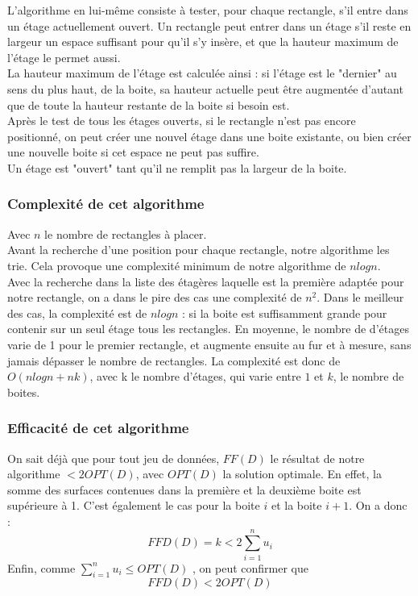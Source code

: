 \documentclass[12pt]{article}
\begin{document}
L'algorithme en lui-même consiste à tester, pour chaque rectangle, s'il entre dans un étage actuellement ouvert. Un rectangle peut entrer dans un étage s'il reste en largeur un espace suffisant pour qu'il s'y insère, et que la hauteur maximum de l'étage le permet aussi. \\
La hauteur maximum de l'étage est calculée ainsi : si l'étage est le "dernier" au sens du plus haut, de la boite, sa hauteur actuelle peut être augmentée d'autant que de toute la hauteur restante de la boite si besoin est. \\
Après le test de tous les étages ouverts, si le rectangle n'est pas encore positionné, on peut créer une nouvel étage dans une boite existante, ou bien créer une nouvelle boite si cet espace ne peut pas suffire.\\
Un étage est "ouvert" tant qu'il ne remplit pas la largeur de la boite.  \\

\subsubsection*{Complexité de cet algorithme}
Avec $n$ le nombre de rectangles à placer. \\
Avant la recherche d'une position pour chaque rectangle, notre algorithme les trie. Cela provoque une complexité minimum de notre algorithme de $n log n$. \\
Avec la recherche dans la liste des étagères laquelle est la première adaptée pour notre rectangle, on a dans le pire des cas une complexité de $n^2$. 
Dans le meilleur des cas, la complexité est de $n log n$ : si la boite est suffisamment grande pour contenir sur un seul étage tous les rectangles. 
En moyenne, le nombre de d'étages varie de 1 pour le premier rectangle, et augmente ensuite au fur et à mesure, sans jamais dépasser le nombre de rectangles. La complexité est donc de $O(n log n + nk)$, avec k le nombre d'étages, qui varie entre $1$ et $k$, le nombre de boites. 

\subsubsection*{Efficacité de cet algorithme}
On sait déjà que pour tout jeu de données, $FF(D)$ le résultat de notre algorithme $< 2OPT(D)$, avec $OPT(D)$ la solution optimale. En effet, la somme des surfaces contenues dans la première et la deuxième boite est supérieure à 1. C'est également le cas pour la boite $i$ et la boite $i+1$. 
On a donc : 
\[ FFD(D) = k < 2 \sum_{i=1}^n u_{i} \]
Enfin, comme $ \sum_{i=1}^n u_{i} \leq OPT(D)$ , on peut confirmer que 
\[ FFD(D)<2OPT(D) \]
\end{document}
